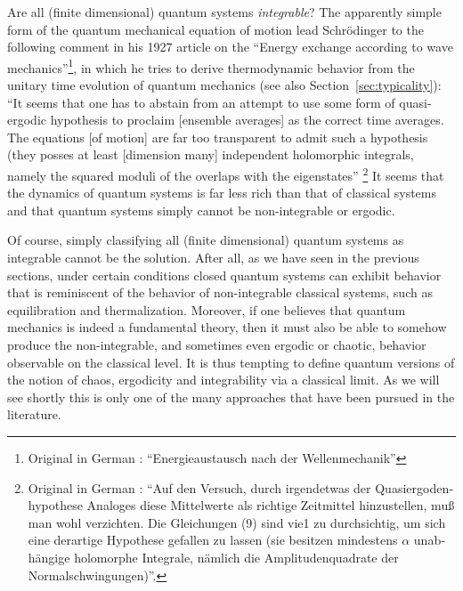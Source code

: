 \documentclass[a4paper,12pt,listof=totoc,index=totoc,bibliography=totoc,headsepline=false,headings=normal,BCOR16.153846mm,DIV12,headinclude,twoside,cleardoublepage=empty,numbers=noenddot,final]{scrreprt}
\theoremstyle{mystyle}
\numberwithin{equation}{section}
\numberwithin{figure}{section}
\numberwithin{lemma}{section}
\numberwithin{theorem}{section}
\numberwithin{corollary}{section}
\numberwithin{definition}{section}
\numberwithin{conjecture}{section}
\numberwithin{observation}{section}
\newcommand{\+}{\mkern2mu}
\DeclareMathOperator{\1}{\mathds{1}}
\begin{document}
Are all (finite dimensional) quantum systems \emph{integrable}?
The apparently simple form of the quantum mechanical equation of motion lead Schrödinger to the following comment in his 1927 article on the ``Energy exchange according to wave mechanics''\footnote{Original in German \cite{Schroedinger1927}: \foreignlanguage{ngerman}{``Energieaustausch nach der Wellenmechanik''}}, in which he tries to derive thermodynamic behavior from the unitary time evolution of quantum mechanics (see also Section~\ref{sec:typicality}):
``It seems that one has to abstain from an attempt to use some form of quasi-ergodic hypothesis to proclaim [ensemble averages] as the correct time averages. The equations [of motion] are far too transparent to admit such a hypothesis (they posses at least [dimension many] independent holomorphic integrals, namely the squared moduli of the overlaps with the eigenstates''%
\footnote{Original in German \cite{Schroedinger1927}: \foreignlanguage{ngerman}{``Auf den Versuch, durch irgendetwas der Quasiergodenhypothese Analoges diese Mittelwerte als richtige Zeitmittel hinzustellen, muß man wohl verzichten. Die Gleichungen (9) sind vie1 zu durchsichtig, um sich eine derartige Hypothese gefallen zu lassen (sie besitzen mindestens $\alpha$ unabhängige holomorphe Integrale, nämlich die Amplitudenquadrate der \glqq{}Normalschwingungen\grqq{})''.}}
It seems that the dynamics of quantum systems is far less rich than that of classical systems and that quantum systems simply cannot be non-integrable or ergodic.

Of course, simply classifying all (finite dimensional) quantum systems as integrable cannot be the solution.
After all, as we have seen in the previous sections, under certain conditions closed quantum systems can exhibit behavior that is reminiscent of the behavior of non-integrable classical systems, such as equilibration and thermalization.
Moreover, if one believes that quantum mechanics is indeed a fundamental theory, then it must also be able to somehow produce the non-integrable, and sometimes even ergodic or chaotic, behavior observable on the classical level.
It is thus tempting to define quantum versions of the notion of chaos, ergodicity and integrability via a classical limit.
As we will see shortly this is only one of the many approaches that have been pursued in the literature.
\end{document}

